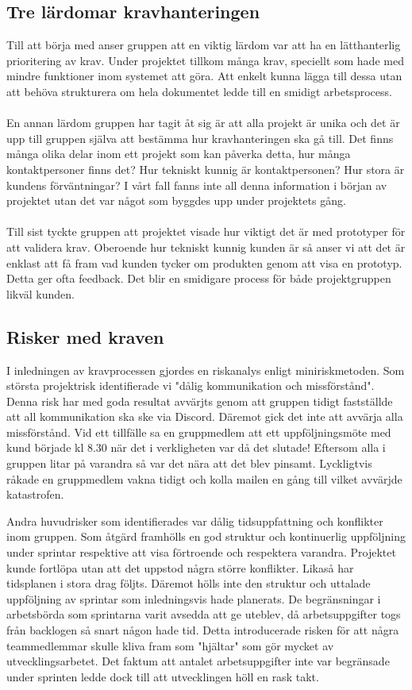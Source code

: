 \documentclass[12pt]{article}
\begin{document}
\subsection{Tre lärdomar kravhanteringen}
Till att börja med anser gruppen att en viktig lärdom var att ha en lätthanterlig prioritering av krav. Under projektet tillkom många krav, speciellt som hade med mindre funktioner inom systemet att göra. Att enkelt kunna lägga till dessa utan att behöva strukturera om hela dokumentet ledde till en smidigt arbetsprocess.
\\\\
En annan lärdom gruppen har tagit åt sig är att alla projekt är unika och det är upp till gruppen själva att bestämma hur kravhanteringen ska gå till. Det finns många olika delar inom ett projekt som kan påverka detta, hur många kontaktpersoner finns det? Hur tekniskt kunnig är kontaktpersonen? Hur stora är kundens förväntningar? I vårt fall fanns inte all denna information i början av projektet utan det var något som byggdes upp under projektets gång. 
\\\\
Till sist tyckte gruppen att projektet visade hur viktigt det är med prototyper för att validera krav. Oberoende hur tekniskt kunnig kunden är så anser vi att det är enklast att få fram vad kunden tycker om produkten genom att visa en prototyp. Detta ger ofta feedback. Det blir en smidigare process för både projektgruppen likväl kunden.

\subsection{Risker med kraven}

I inledningen av kravprocessen gjordes en riskanalys enligt miniriskmetoden. Som största projektrisk identifierade vi "dålig kommunikation och missförstånd". Denna risk har med goda resultat avvärjts genom att gruppen tidigt fastställde att all kommunikation ska ske via Discord. Däremot gick det inte att avvärja alla missförstånd. Vid ett tillfälle sa en gruppmedlem att ett uppföljningsmöte med kund började kl 8.30 när det i verkligheten var då det slutade! Eftersom alla i gruppen litar på varandra så var det nära att det blev pinsamt. Lyckligtvis råkade en gruppmedlem vakna tidigt och kolla mailen en gång till vilket avvärjde katastrofen. 

Andra huvudrisker som identifierades var dålig tidsuppfattning och konflikter inom gruppen. Som åtgärd framhölls en god struktur och kontinuerlig uppföljning under sprintar respektive att visa förtroende och respektera varandra. Projektet kunde fortlöpa utan att det uppstod några större konflikter. Likaså har tidsplanen i stora drag följts. Däremot hölls inte den struktur och uttalade uppföljning av sprintar som inledningsvis hade planerats. De begränsningar i arbetsbörda som sprintarna varit avsedda att ge uteblev, då arbetsuppgifter togs från backlogen så snart någon hade tid. Detta introducerade risken för att några teammedlemmar skulle kliva fram som "hjältar" som gör mycket av utvecklingsarbetet. Det faktum att antalet arbetsuppgifter inte var begränsade under sprinten ledde dock till att utvecklingen höll en rask takt.
\end{document}
